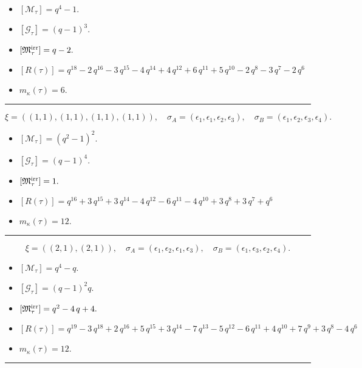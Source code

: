 \documentclass[10pt,a4paper]{amsart}
\begin{document}
\begin{itemize}
 \item $[\mathcal{M}_{\tau}] = q^{4} - 1 .$

 \item $[\mathcal{G}_{\tau}] = {\left(q - 1\right)}^{3} .$

 \item $[{\frak M}_{\tau}^{\textrm{irr}}] = q - 2 .$

 \item $[R(\tau)] = q^{18} - 2 \, q^{16} - 3 \, q^{15} - 4 \, q^{14} + 4 \, q^{12} + 6 \, q^{11} + 5 \, q^{10} - 2 \, q^{8} - 3 \, q^{7} - 2 \, q^{6} $

 \item $m_{\kappa}(\tau) = 6 .$

 \end{itemize}
\noindent\rule{8cm}{0.4pt}

$$\xi = ({(1, 1), (1, 1)}, {(1, 1), (1, 1)}),\quad \sigma_A = ({{\epsilon_1}, {\epsilon_1}}, {{\epsilon_2}, {\epsilon_3}}),\quad \sigma_B = ({{\epsilon_1}, {\epsilon_2}}, {{\epsilon_3}, {\epsilon_4}}).$$

\begin{itemize}
 \item $[\mathcal{M}_{\tau}] = {\left(q^{2} - 1\right)}^{2} .$

 \item $[\mathcal{G}_{\tau}] = {\left(q - 1\right)}^{4} .$

 \item $[{\frak M}_{\tau}^{\textrm{irr}}] = 1 .$

 \item $[R(\tau)] = q^{16} + 3 \, q^{15} + 3 \, q^{14} - 4 \, q^{12} - 6 \, q^{11} - 4 \, q^{10} + 3 \, q^{8} + 3 \, q^{7} + q^{6} $

 \item $m_{\kappa}(\tau) = 12 .$

 \end{itemize}
\noindent\rule{8cm}{0.4pt}

$$\xi = ({(2, 1)}, {(2, 1)}),\quad \sigma_A = ({{\epsilon_1, \epsilon_2}}, {{\epsilon_1, \epsilon_3}}),\quad \sigma_B = ({{\epsilon_1, \epsilon_3}}, {{\epsilon_2, \epsilon_4}}).$$

\begin{itemize}
 \item $[\mathcal{M}_{\tau}] = q^{4} - q .$

 \item $[\mathcal{G}_{\tau}] = {\left(q - 1\right)}^{2} q .$

 \item $[{\frak M}_{\tau}^{\textrm{irr}}] = q^{2} - 4 \, q + 4 .$

 \item $[R(\tau)] = q^{19} - 3 \, q^{18} + 2 \, q^{16} + 5 \, q^{15} + 3 \, q^{14} - 7 \, q^{13} - 5 \, q^{12} - 6 \, q^{11} + 4 \, q^{10} + 7 \, q^{9} + 3 \, q^{8} - 4 \, q^{6} $

 \item $m_{\kappa}(\tau) = 12 .$

 \end{itemize}
\noindent\rule{8cm}{0.4pt}
\end{document}
